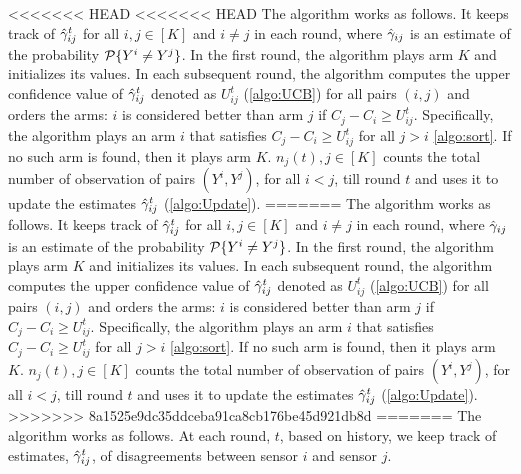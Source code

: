 	\vspace{.2cm}
<<<<<<< HEAD
<<<<<<< HEAD
The algorithm works as follows. It keeps track of $\hgamma^t_{ij}$ for all $i,j \in [K]$ and $i\neq j$ in each round, where $\hgamma_{ij}$ is an estimate of the probability $\P\{Y^i \neq Y^j\}$. In the first round, the algorithm plays arm $K$ and initializes its values. In each subsequent round, the algorithm computes the upper confidence value of $\hgamma^t_{ij}$ denoted as $U^t_{ij}$ (\ref{algo:UCB}) for all pairs $(i,j)$ and orders the arms: $i$ is considered better than arm $j$ if $C_j-C_i \geq U^t_{ij}$. Specifically, the algorithm plays an arm $i$ that satisfies $C_j-C_i \geq U^t_{ij}$ for all $j>i$ \ref{algo:sort}. If no such arm is found, then it plays arm $K$.  $n_j(t), j\in [K] $ counts the total number of observation of pairs $(Y^i, Y^j)$, for all $i<j$, till round $t$ and uses it to update the estimates $\hgamma_{ij}^t$ (\ref{algo:Update}).    %
=======
The algorithm works as follows. It keeps track of $\hgamma^t_{ij}$ for all $i,j \in [K]$ and $i\neq j$ in each round, where $\hgamma_{ij}$ is an estimate of the probability $\P\{Y^i \neq Y^j\}$. In the first round, the algorithm plays arm $K$ and initializes its values. In each subsequent round, the algorithm computes the upper confidence value of $\hgamma^t_{ij}$ denoted as $U^t_{ij}$ (\ref{algo:UCB}) for all pairs $(i,j)$ and orders the arms: $i$ is considered better than arm $j$ if $C_j-C_i \geq U^t_{ij}$. Specifically, the algorithm plays an arm $i$ that satisfies $C_j-C_i \geq U^t_{ij}$ for all $j>i$ \ref{algo:sort}. If no such arm is found, then it plays arm $K$.  $n_j(t), j\in [K] $ counts the total number of observation of pairs $(Y^i, Y^j)$, for all $i<j$, till round $t$ and uses it to update the estimates $\hgamma_{ij}^t$ (\ref{algo:Update}).     
>>>>>>> 8a1525e9dc35ddceba91ca8cb176be45d921db8d
=======
The algorithm works as follows. At each round, $t$, based on history, we keep track of estimates, $\hgamma^t_{ij}$, of disagreements between sensor $i$ and sensor $j$.  %
